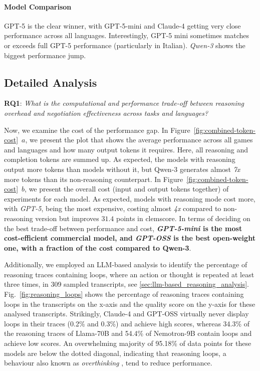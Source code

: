 \documentclass[11pt]{article}
\begin{document}
\paragraph{Model Comparison} GPT-5 is the clear winner, with GPT-5-mini and Claude-4 getting very close performance across all languages. Interestingly, GPT-5 mini sometimes matches or exceeds full GPT-5 performance (particularly in Italian). \textit{Qwen-3} shows the biggest performance jump.

\subsection{Detailed Analysis}

\textbf{RQ1}: \textit{What is the computational and performance trade-off between reasoning overhead and negotiation effectiveness across tasks and languages?}

Now, we examine the cost of the performance gap. In Figure~\ref{fig:combined-token-cost}~$a$, we present the plot that shows the average performance across all games and languages and how many output tokens it requires. Here, all reasoning and completion tokens are summed up. As expected, the models with reasoning output more tokens than models without it, but Qwen-3 generates almost \textit{7x} more tokens than its non-reasoning counterpart. In Figure~\ref{fig:combined-token-cost}~$b$, we present the overall cost (input and output tokens together) of experiments for each model. As expected, models with reasoning mode cost more, with \textit{GPT-5}, being the most expensive, costing almost \textit{4x} compared to non-reasoning version but improves $31.4$ points in clemscore. In terms of deciding on the best trade-off between performance and cost, \textbf{\textit{GPT-5-mini} is the most cost-efficient commercial model, and \textit{GPT-OSS} is the best open-weight one, with a fraction of the cost compared to Qwen-3}.

Additionally, we employed an LLM-based analysis to identify the percentage of reasoning traces containing loops, where an action or thought is repeated at least three times, in 309 sampled transcripts, see \ref{sec:llm-based_reasoning_analysis}. Fig.~\ref{fig:reasoning_loops} shows the percentage of reasoning traces containing loops in the transcripts on the x-axis and the quality score on the y-axis for these analysed transcripts. 
Strikingly, Claude-4 and GPT-OSS virtually never display loops in their traces (0.2\% and 0.3\%) and achieve high scores, whereas 34.3\% of the reasoning traces of Llama-70B and 54.4\% of Nemotron-9B contain loops and achieve low scores. An overwhelming majority of 95.18\% of data points for these models are below the dotted diagonal, indicating that reasoning loops, a behaviour also known as \textit{overthinking} \cite{DBLP:journals/corr/abs-2506-06941}, tend to reduce performance.
\end{document}
